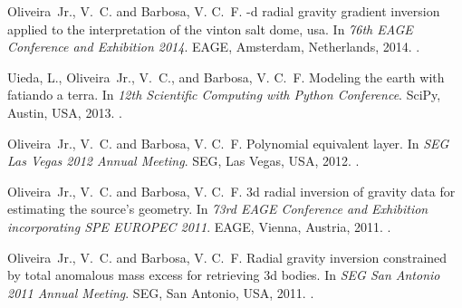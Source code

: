 \begin{thebibliography}{10}
Oliveira~Jr., V.~C. and Barbosa, V. C.~F.
-d radial gravity gradient inversion applied to the interpretation
  of the vinton salt dome, usa.
\newblock In \emph{76th EAGE Conference and Exhibition 2014}. EAGE, Amsterdam,
  Netherlands, 2014.
.

Uieda, L., Oliveira~Jr., V.~C., and Barbosa, V. C.~F.
\newblock Modeling the earth with fatiando a terra.
\newblock In \emph{12th Scientific Computing with Python Conference}. SciPy,
  Austin, USA, 2013.
.

Oliveira~Jr., V.~C. and Barbosa, V. C.~F.
\newblock Polynomial equivalent layer.
\newblock In \emph{SEG Las Vegas 2012 Annual Meeting}. SEG, Las Vegas, USA,
  2012.
.

Oliveira~Jr., V.~C. and Barbosa, V. C.~F.
\newblock 3d radial inversion of gravity data for estimating the source's
  geometry.
\newblock In \emph{73rd EAGE Conference and Exhibition incorporating SPE
  EUROPEC 2011}. EAGE, Vienna, Austria, 2011{}.
.

Oliveira~Jr., V.~C. and Barbosa, V. C.~F.
\newblock Radial gravity inversion constrained by total anomalous mass excess
  for retrieving 3d bodies.
\newblock In \emph{SEG San Antonio 2011 Annual Meeting}. SEG, San Antonio, USA,
  2011{}.
.

\end{thebibliography}
